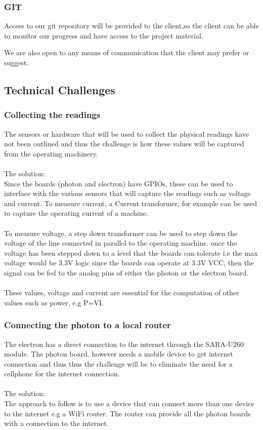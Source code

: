 \documentclass[a4paper,12pt]{article}
\begin{document}
\subsubsection{GIT}

Access to our git repository will be provided to the client,so the client can be able to monitor
our progress and have access to the project material.

We are also open to any means of communication that the client may prefer or suggest.

\subsection{Technical Challenges}
\subsubsection{Collecting the readings}
The sensors or hardware that will be used to collect the physical readings have not been outlined and thus the challenge is how these values will be captured from the operating machinery.\\ \\
The solution:\\ 
Since the boards (photon and electron) have GPIOs, these can be used to interface with the various sensors that will capture the readings such as voltage and current. To measure current, a Current transformer, for example can be used to capture the operating current of a machine.\\
\\
To measure voltage, a step down transformer can be used to step down the voltage of the line connected in parallel to the operating machine. once the voltage has been stepped down to a level that the boards can tolerate i.e the max voltage would be 3.3V logic since the boards can operate at 3.3V VCC, then the signal can be fed to the analog pins of either the photon or the electron board.
\\ \\
These values, voltage and current are essential for the computation of other values such as power, e.g P=VI. 

\subsubsection{Connecting the photon to a local router}
The electron has a direct connection to the internet through the SARA-U260 module. The photon board, however needs a mobile device to get internet connection and thus thus the challenge will be to eliminate the need for a cellphone for the internet connection.\\ \\
The solution:\\
The approach to follow is to use a device that can connect more than one device to the internet e.g a WiFi router. The router can provide all the photon boards with a connection to the internet. 
\end{document}

